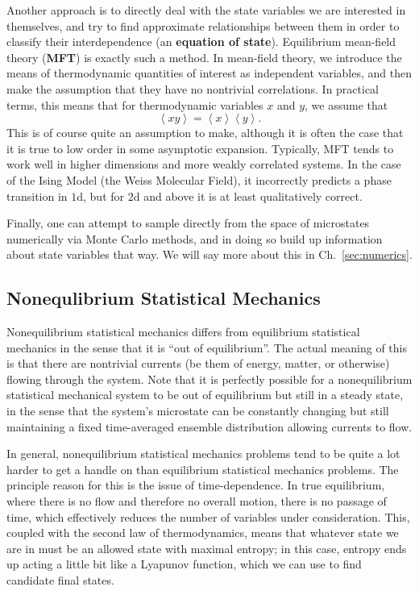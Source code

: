 Another approach is to directly deal with the state variables we are interested in themselves,
and try to find approximate relationships between them in order to classify their interdependence (an
\textbf{equation of state}). Equilibrium mean-field theory (\textbf{MFT}) is exactly such a method.
In mean-field theory, we introduce the means of thermodynamic quantities of interest as independent
variables, and then make the assumption that they have no nontrivial correlations. In practical terms,
this means that for thermodynamic variables $x$ and $y$, we assume that
\begin{equation}
 \left\langle x y \right\rangle = \left\langle x  \right\rangle \left\langle y \right\rangle.
\end{equation}
This is of course quite an assumption to make, although it is often the case that it is true to low
order in some asymptotic expansion. Typically, MFT tends to work well in higher dimensions and more
weakly correlated systems. In the case of the Ising Model (the Weiss Molecular Field), it incorrectly predicts a phase transition
in $1$d, but for $2$d and above it is at least qualitatively correct.

Finally, one can attempt to sample directly from the space of microstates numerically via Monte Carlo
methods, and in doing so build up information about state variables that way.
We will say more about this in Ch.~\ref{sec:numerics}.

\subsection{Nonequlibrium Statistical Mechanics}
Nonequilibrium statistical mechanics differs from equilibrium statistical mechanics in the sense that
it is ``out of equilibrium''. The actual meaning of this is that there are nontrivial currents
(be them of energy, matter, or otherwise) flowing through the system. Note that it is perfectly
possible for a nonequilibrium statistical mechanical system to be out of equilibrium but still in a
steady state, in the sense that the system's microstate can be constantly changing but still
maintaining a fixed time-averaged ensemble distribution allowing currents to flow.

In general, nonequilibrium statistical mechanics problems tend to be quite a lot harder to get 
a handle on than equilibrium statistical mechanics problems. The principle reason for this is the
issue of time-dependence. In true equilibrium, where there is no flow and therefore no overall motion, there is no passage of time, which effectively reduces the number of variables under consideration. This, coupled with the second law of thermodynamics, means that whatever state we are
in must be an allowed state with maximal entropy; in this case, entropy ends up acting a little bit
like a Lyapunov function, which we can use to find candidate final states. 

